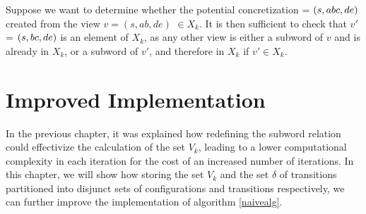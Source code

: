 

\begin{exmp}
Suppose we want to determine whether the potential concretization  = $(s, abc, de)$ created from the view $v = (s, ab, de)$ $\in X_k$. It is then sufficient to check that $v'$ = $(s,bc,de)$ is an element of $X_k$, as any other view is either a subword of $v$ and is already in $X_k$, or a subword of $v'$, and therefore in $X_k$ if $v' \in X_k$.
\end{exmp}
\newpage
\newpage
\section{Improved Implementation}
\label{improved1}
In the previous chapter, it was explained how redefining the subword relation could effectivize the calculation of the set $V_k$, leading to a lower computational complexity in each iteration for the cost of an increased number of iterations. In this chapter, we will show how storing the set $V_k$ and the set $\delta$ of transitions partitioned into disjunct sets of configurations and transitions respectively, we can further improve the implementation of algorithm \ref{naivealg}.



